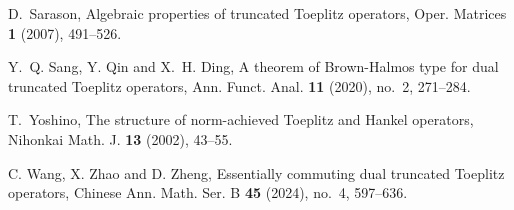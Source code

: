 \documentclass[12pt]{amsart}
\theoremstyle{definition}
\theoremstyle{remark}
\numberwithin{equation}{section}
\begin{document}
\begin{thebibliography}{}
 D.~Sarason, Algebraic properties of truncated Toeplitz operators, Oper. Matrices \textbf{1} (2007), 491--526.



Y.~Q. Sang, Y. Qin and X.~H. Ding, A theorem of Brown-Halmos type for dual truncated Toeplitz operators, Ann. Funct. Anal. {\bf 11} (2020), no.~2, 271--284.




T.~Yoshino, The structure of norm-achieved Toeplitz and Hankel operators, Nihonkai Math. J. \textbf{13} (2002), 43--55.
		
C. Wang, X. Zhao and D. Zheng, Essentially commuting dual truncated Toeplitz operators, Chinese Ann. Math. Ser. B {\bf 45} (2024), no.~4, 597--636.




\end{thebibliography}








	
\end{document}
